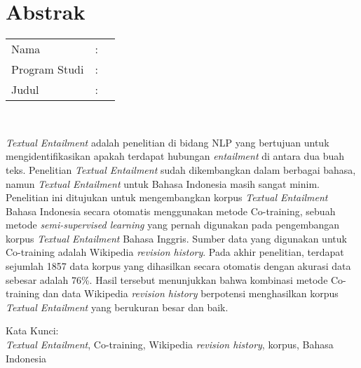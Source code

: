 %
%
%

\chapter*{Abstrak}

\vspace*{0.2cm}

\noindent \begin{tabular}{l l p{10cm}}
	Nama&: & \penulis \\
	Program Studi&: & \program \\
	Judul&: & \judul \\
\end{tabular} \\ 

\vspace*{0.5cm}

\noindent
\textit{Textual Entailment} adalah penelitian di bidang NLP yang bertujuan untuk mengidentifikasikan apakah terdapat hubungan \textit{entailment} di antara dua buah teks. Penelitian \textit{Textual Entailment} sudah dikembangkan dalam berbagai bahasa, namun \textit{Textual Entailment} untuk Bahasa Indonesia masih sangat minim. Penelitian ini ditujukan untuk mengembangkan korpus \textit{Textual Entailment} Bahasa Indonesia secara otomatis menggunakan metode Co-training, sebuah metode \textit{semi-supervised learning} yang pernah digunakan pada pengembangan korpus \textit{Textual Entailment} Bahasa Inggris. Sumber data yang digunakan untuk Co-training adalah Wikipedia \textit{revision history}. Pada akhir penelitian, terdapat sejumlah 1857 data korpus yang dihasilkan secara otomatis dengan akurasi data sebesar adalah 76\%. Hasil tersebut menunjukkan bahwa kombinasi metode Co-training dan data Wikipedia \textit{revision history} berpotensi menghasilkan korpus \textit{Textual Entailment} yang berukuran besar dan baik.


\vspace*{0.2cm}

\noindent Kata Kunci: \\ 
\noindent \textit{Textual Entailment}, Co-training, Wikipedia \textit{revision history}, korpus, Bahasa Indonesia\\

\newpage
